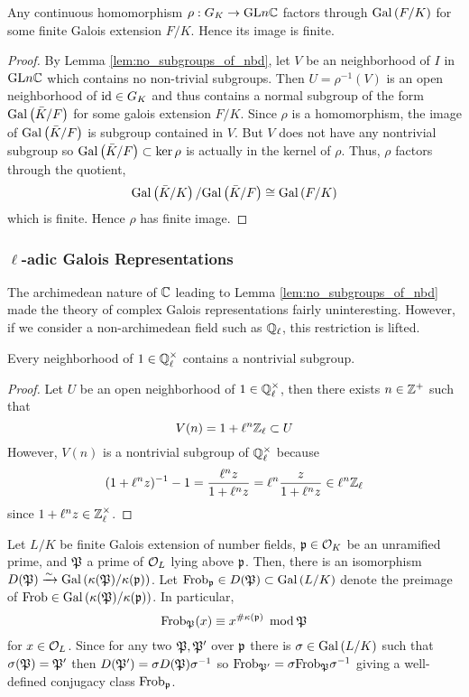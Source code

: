 \documentclass[12pt]{article}
\begin{document}
\begin{proposition} \label{prop:complex_galois_rep_finite}
Any continuous homomorphism $\rho: G_{K} \to \mathrm{GL}{n}{\mathbb{C}}$ factors through $\mathrm{Gal}\left( F/K \right)$ for some finite Galois extension $F / K$. Hence its image is finite.
\end{proposition}
\begin{proof}
By Lemma \ref{lem:no_subgroups_of_nbd}, let $V$ be an neighborhood of $I$ in $\mathrm{GL}{n}{\mathbb{C}}$ which contains no non-trivial subgroups. Then $U = \rho^{-1}(V)$ is an open neighborhood of $\mathrm{id} \in G_K$ and thus contains a normal subgroup of the form $\mathrm{Gal}\left( \bar{K} / F \right)$ for some galois extension $F / K$.
Since $\rho$ is a homomorphism, the image of $\mathrm{Gal}\left( \bar{K} / F \right)$ is subgroup contained in $V$. But $V$ does not have any nontrivial subgroup so $\mathrm{Gal}\left( \bar{K} / F  \right) \subset \ker{\rho}$ is actually in the kernel of $\rho$. Thus, $\rho$ factors through the quotient,
\[ \mathrm{Gal}\left( \bar{K} / K \right) / \mathrm{Gal}\left( \bar{K} / F \right) \cong \mathrm{Gal}\left( F / K \right) \]
which is finite. Hence $\rho$ has finite image.
\end{proof}


\subsubsection{$\ell$-adic Galois Representations}

\begin{rmk}
The archimedean nature of $\mathbb{C}$ leading to Lemma \ref{lem:no_subgroups_of_nbd} made the theory of complex Galois representations fairly uninteresting. However, if we consider a non-archimedean field such as $\mathbb{Q}_{\ell}$, this restriction is lifted. 
\end{rmk}

\begin{proposition}
Every neighborhood of $1 \in \mathbb{Q}_{\ell}^\times$ contains a nontrivial subgroup.
\end{proposition}
\begin{proof}
Let $U$ be an open neighborhood of $1 \in \mathbb{Q}_{\ell}^\times$, then there exists $n \in \mathbb{Z}^+$ such that \[V(n) = 1 + \ell^n \mathbb{Z}_{\ell} \subset U\] 
However, $V(n)$ is a nontrivial subgroup of $\mathbb{Q}_{\ell}^\times$ because 
\[(1 + \ell^n z)^{-1} - 1 = \frac{ \ell^n z }{1 + \ell^n z} = \ell^n \frac{z}{1 + \ell^n z} \in \ell^n \mathbb{Z}_{\ell} \]
since $1 + \ell^n z \in \mathbb{Z}_{\ell}^\times$. 
\end{proof}

\begin{definition}
Let $L/K$ be finite Galois extension of number fields, $\mathfrak{p} \in \mathcal{O}_{K}$ be an unramified prime, and $\mathfrak{P}$ a prime of $\mathcal{O}_{L}$ lying above $\mathfrak{p}$. Then, there is an isomorphism $D(\mathfrak{P}) \xrightarrow{\sim} \mathrm{Gal}\left( \kappa(\mathfrak{P})/\kappa(\mathfrak{p}) \right)$. Let $\mathrm{Frob}_{\mathfrak{p}} \in D(\mathfrak{P}) \subset \mathrm{Gal}\left( L/K \right)$ denote the preimage of $\mathrm{Frob} \in \mathrm{Gal}\left( \kappa(\mathfrak{P})/\kappa(\mathfrak{p}) \right)$. In particular,
\[ \mathrm{Frob}_{\mathfrak{P}}(x) \equiv x^{\#\kappa(\mathfrak{p})}  \: \: \mathrm{mod} \:  \mathfrak{P} \] 
for $x \in \mathcal{O}_{L}$. Since for any two $\mathfrak{P}, \mathfrak{P}'$ over $\mathfrak{p}$ there is $\sigma \in \mathrm{Gal}\left( L/K \right)$ such that $\sigma(\mathfrak{P}) = \mathfrak{P}'$ then $D(\mathfrak{P}') = \sigma D(\mathfrak{P}) \sigma^{-1}$ so $\mathrm{Frob}_{\mathfrak{P}'} = \sigma \mathrm{Frob}_{\mathfrak{P}} \sigma^{-1}$ giving a well-defined conjugacy class $\mathrm{Frob}_{\mathfrak{p}}$.
\end{definition}
\end{document}
